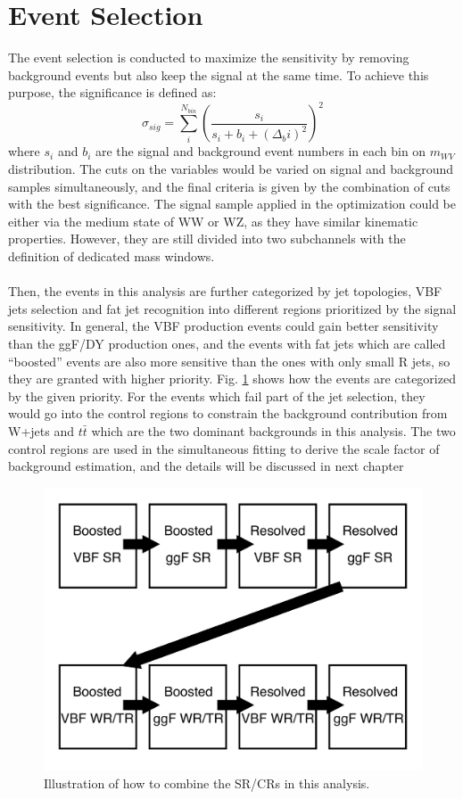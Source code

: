 \section{Event Selection}
The event selection is conducted to maximize the sensitivity by removing background events but also keep the signal at the same time. To achieve this purpose, the significance is defined as:
\begin{equation}
\label{Eq:significance}
\sigma_{sig} = \displaystyle\sum_{i}^{N_{bin}}( \frac{s_i}{s_i+b_i+(\Delta_bi)^2})^2
\end{equation}
where $s_i$ and $b_i$ are the signal and background event numbers in each bin on $m_{WV}$ distribution. The cuts on the variables would be varied on signal and background samples simultaneously, and the final criteria is given by the combination of cuts with the best significance. The signal sample applied in the optimization could be either via the medium state of WW or WZ, as they have similar kinematic properties. However, they are still divided into two subchannels with the definition of dedicated mass windows.  
\\
\\Then, the events in this analysis are further categorized by jet topologies, VBF jets selection and fat jet recognition into different regions prioritized by the signal sensitivity. In general, the VBF production events could gain better sensitivity than the ggF/DY production ones, and the events with fat jets which are called ``boosted'' events are also more sensitive than the ones with only small R jets, so they are granted with higher priority. Fig. \ref{Fig:order} shows how the events are categorized by the given priority. For the events which fail part of the jet selection, they would go into the control regions to constrain the background contribution from W+jets and $t\bar{t}$ which are the two dominant backgrounds in this analysis. The two control regions are used in the simultaneous fitting to derive the scale factor of background estimation, and the details will be discussed in next chapter
\begin{figure}[h]
	\centering
	\includegraphics[width=0.7\hsize]{Chapter3/order}
	\caption{Illustration of how to combine the SR/CRs in this analysis.}
	\label{Fig:order}
\end{figure}

